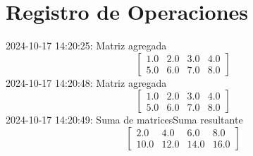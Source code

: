\documentclass{article}%
\begin{document}
%
\normalsize%
\section{Registro de Operaciones}%
\label{sec:RegistrodeOperaciones}%
2024{-}10{-}17 14:20:25: Matriz agregada\newline%
%
\[%
\begin{bmatrix} 1.0 & 2.0 & 3.0 & 4.0 \\ 5.0 & 6.0 & 7.0 & 8.0 \end{bmatrix}%
\]%
2024{-}10{-}17 14:20:48: Matriz agregada\newline%
%
\[%
\begin{bmatrix} 1.0 & 2.0 & 3.0 & 4.0 \\ 5.0 & 6.0 & 7.0 & 8.0 \end{bmatrix}%
\]%
2024{-}10{-}17 14:20:49: Suma de matricesSuma resultante\newline%
%
\[%
\begin{bmatrix} 2.0 & 4.0 & 6.0 & 8.0 \\ 10.0 & 12.0 & 14.0 & 16.0 \end{bmatrix}%
\]

%
\end{document}
